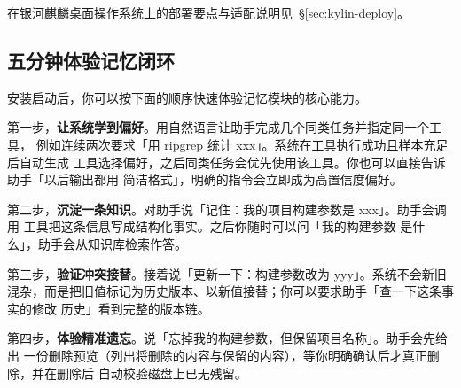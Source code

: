 在银河麒麟桌面操作系统上的部署要点与适配说明见~\S\ref{sec:kylin-deploy}。

\subsection{五分钟体验记忆闭环}

安装启动后，你可以按下面的顺序快速体验记忆模块的核心能力。

第一步，\textbf{让系统学到偏好}。用自然语言让助手完成几个同类任务并指定同一个工具，
例如连续两次要求「用 ripgrep 统计 xxx」。系统在工具执行成功且样本充足后自动生成
工具选择偏好，之后同类任务会优先使用该工具。你也可以直接告诉助手「以后输出都用
简洁格式」，明确的指令会立即成为高置信度偏好。

第二步，\textbf{沉淀一条知识}。对助手说「记住：我的项目构建参数是 xxx」。助手会调用
 工具把这条信息写成结构化事实。之后你随时可以问「我的构建参数
是什么」，助手会从知识库检索作答。

第三步，\textbf{验证冲突接替}。接着说「更新一下：构建参数改为 yyy」。系统不会新旧
混杂，而是把旧值标记为历史版本、以新值接替；你可以要求助手「查一下这条事实的修改
历史」看到完整的版本链。

第四步，\textbf{体验精准遗忘}。说「忘掉我的构建参数，但保留项目名称」。助手会先给出
一份删除预览（列出将删除的内容与保留的内容），等你明确确认后才真正删除，并在删除后
自动校验磁盘上已无残留。
